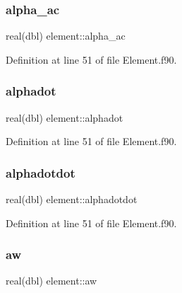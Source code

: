 \subsubsection{\texorpdfstring{alpha\+\_\+ac}{alpha\_ac}}
{\footnotesize\ttfamily real(dbl) element\+::alpha\+\_\+ac\hspace{0.3cm}{\ttfamily [private]}}



Definition at line 51 of file Element.\+f90.

\mbox{\label{namespaceelement_ac749aa20088ae7c80700929a64803dfe}} 
\subsubsection{\texorpdfstring{alphadot}{alphadot}}
{\footnotesize\ttfamily real(dbl) element\+::alphadot\hspace{0.3cm}{\ttfamily [private]}}



Definition at line 51 of file Element.\+f90.

\mbox{\label{namespaceelement_a3b4df4c1043c9ebd56f5d23ca24d00ac}} 
\subsubsection{\texorpdfstring{alphadotdot}{alphadotdot}}
{\footnotesize\ttfamily real(dbl) element\+::alphadotdot\hspace{0.3cm}{\ttfamily [private]}}



Definition at line 51 of file Element.\+f90.

\mbox{\label{namespaceelement_a3a0a4401f2461a4b65f656a9af6e23d8}} 
\subsubsection{\texorpdfstring{aw}{aw}}
{\footnotesize\ttfamily real(dbl) element\+::aw\hspace{0.3cm}{\ttfamily [private]}}



